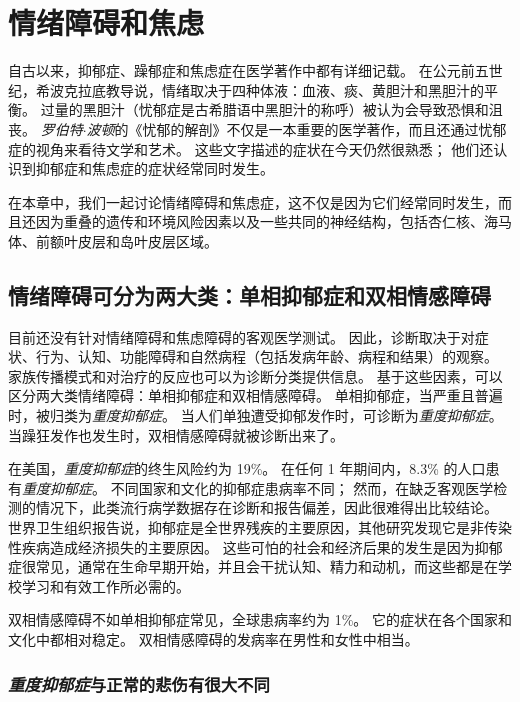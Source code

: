 \chapter{情绪障碍和焦虑} \label{chap:chap61}

自古以来，抑郁症、躁郁症和焦虑症在医学著作中都有详细记载。
在公元前五世纪，希波克拉底教导说，情绪取决于四种体液：血液、痰、黄胆汁和黑胆汁的平衡。
过量的黑胆汁（忧郁症是古希腊语中黑胆汁的称呼）被认为会导致恐惧和沮丧。
\textit{罗伯特$\cdot$波顿}的《忧郁的解剖》不仅是一本重要的医学著作，而且还通过忧郁症的视角来看待文学和艺术。
这些文字描述的症状在今天仍然很熟悉；
他们还认识到抑郁症和焦虑症的症状经常同时发生。


在本章中，我们一起讨论情绪障碍和焦虑症，这不仅是因为它们经常同时发生，而且还因为重叠的遗传和环境风险因素以及一些共同的神经结构，包括杏仁核、海马体、前额叶皮层和岛叶皮层区域。



\section{情绪障碍可分为两大类：单相抑郁症和双相情感障碍}

目前还没有针对情绪障碍和焦虑障碍的客观医学测试。
因此，诊断取决于对症状、行为、认知、功能障碍和自然病程（包括发病年龄、病程和结果）的观察。
家族传播模式和对治疗的反应也可以为诊断分类提供信息。
基于这些因素，可以区分两大类情绪障碍：单相抑郁症和双相情感障碍。
单相抑郁症，当严重且普遍时，被归类为\textit{重度抑郁症}。
当人们单独遭受抑郁发作时，可诊断为\textit{重度抑郁症}。
当躁狂发作也发生时，双相情感障碍就被诊断出来了。


在美国，\textit{重度抑郁症}的终生风险约为 19\%。
在任何 1 年期间内，8.3\% 的人口患有\textit{重度抑郁症}。
不同国家和文化的抑郁症患病率不同；
然而，在缺乏客观医学检测的情况下，此类流行病学数据存在诊断和报告偏差，因此很难得出比较结论。
世界卫生组织报告说，抑郁症是全世界残疾的主要原因，其他研究发现它是非传染性疾病造成经济损失的主要原因。
这些可怕的社会和经济后果的发生是因为抑郁症很常见，通常在生命早期开始，并且会干扰认知、精力和动机，而这些都是在学校学习和有效工作所必需的。


双相情感障碍不如单相抑郁症常见，全球患病率约为 1\%。
它的症状在各个国家和文化中都相对稳定。
双相情感障碍的发病率在男性和女性中相当。



\subsection{\textit{重度抑郁症}与正常的悲伤有很大不同}

